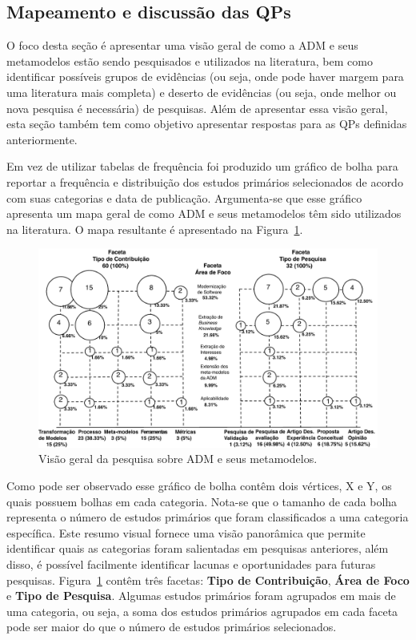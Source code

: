 \subsection{Mapeamento e discussão das QPs}

O foco desta seção é apresentar uma visão geral de como a ADM e seus metamodelos estão sendo pesquisados e utilizados na literatura, bem como identificar possíveis grupos de evidências (ou seja, onde pode haver margem para uma literatura mais completa) e deserto de evidências (ou seja, onde melhor ou nova pesquisa é necessária) de pesquisas. Além de apresentar essa visão geral, esta seção também tem como objetivo apresentar respostas para as QPs definidas anteriormente.

Em vez de utilizar tabelas de frequência foi produzido um gráfico de bolha para reportar a frequência e distribuição dos estudos primários selecionados de acordo com suas categorias e data de publicação. Argumenta-se que esse gráfico apresenta um mapa geral de como ADM e seus metamodelos têm sido utilizados na literatura. O mapa resultante é apresentado na Figura~\ref{fig:mapa_mapeamento_sistematico}.


\begin{figure}[h]
 \caption{Visão geral da pesquisa sobre ADM e seus metamodelos.}
 \label{fig:mapa_mapeamento_sistematico}
 \centering
 \includegraphics[scale=0.8]{images/MapaMS_port}
 \fautor
\end{figure}

Como pode ser observado esse gráfico de bolha contêm dois vértices, X e Y, os quais possuem bolhas em cada categoria. Nota-se que o tamanho de cada bolha representa o número de estudos primários que foram classificados a uma categoria específica. Este resumo visual fornece uma visão panorâmica que permite identificar quais as categorias foram salientadas em pesquisas anteriores, além disso, é possível facilmente identificar lacunas e oportunidades para futuras pesquisas. Figura~\ref{fig:mapa_mapeamento_sistematico} contêm três facetas: \textbf{Tipo de Contribuição}, \textbf{Área de Foco} e \textbf{Tipo de Pesquisa}. Algumas estudos primários foram agrupados em mais de uma categoria, ou seja, a soma dos estudos primários agrupados em cada faceta pode ser maior do que o número de estudos primários selecionados.

